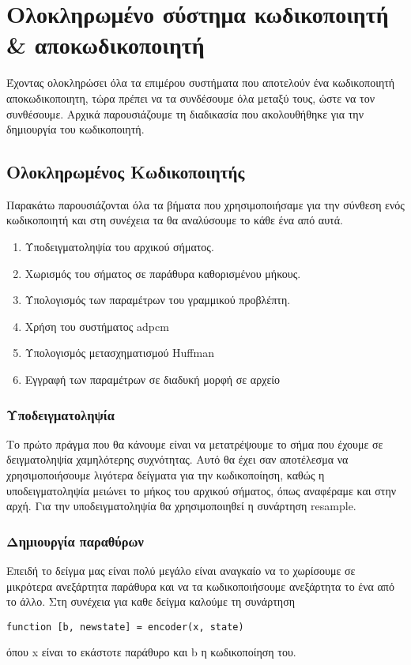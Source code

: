 \chapter{Ολοκληρωμένο σύστημα κωδικοποιητή \& αποκωδικοποιητή}

\par Έχοντας ολοκληρώσει όλα τα επιμέρου συστήματα που αποτελούν ένα κωδικοποιητή 
αποκωδικοποιητη, τώρα πρέπει να τα συνδέσουμε όλα μεταξύ τους, ώστε να τον συνθέσουμε. 
Αρχικά παρουσιάζουμε τη διαδικασία που ακολουθήθηκε για την δημιουργία 
του κωδικοποιητή.
\section{Ολοκληρωμένος Κωδικοποιητής}
\par Παρακάτω παρουσιάζονται όλα τα βήματα που χρησιμοποιήσαμε για την σύνθεση ενός 
κωδικοποιητή και στη συνέχεια τα θα αναλύσουμε το κάθε ένα από αυτά.
\begin{enumerate}
\item Υποδειγματοληψία του αρχικού σήματος.
\item Χωρισμός του σήματος σε παράθυρα καθορισμένου μήκους.
\item Υπολογισμός των παραμέτρων του γραμμικού προβλέπτη.
\item Χρήση του συστήματος adpcm
\item Υπολογισμός μετασχηματισμού Huffman
\item Εγγραφή των παραμέτρων σε διαδυκή μορφή σε αρχείο
\end{enumerate}

\subsection{Υποδειγματοληψία}
\par Το πρώτο πράγμα που θα κάνουμε είναι να μετατρέψουμε το σήμα που έχουμε 
σε δειγματοληψία χαμηλότερης συχνότητας. Αυτό θα έχει σαν αποτέλεσμα να χρησιμοποιήσουμε
λιγότερα δείγματα για την κωδικοποίηση, καθώς η υποδειγματοληψία μειώνει το μήκος 
του αρχικού σήματος, όπως αναφέραμε και στην αρχή. Για την υποδειγματοληψία θα χρησιμοποιηθεί 
η συνάρτηση resample.

\subsection{Δημιουργία παραθύρων}
\par Επειδή το δείγμα μας είναι πολύ μεγάλο είναι αναγκαίο να το χωρίσουμε 
σε μικρότερα ανεξάρτητα παράθυρα και να τα κωδικοποιήσουμε ανεξάρτητα το ένα από 
το άλλο. Στη συνέχεια για καθε δείγμα καλούμε τη συνάρτηση 
\begin{lstlisting}[style=MyMatlab]
 function [b, newstate] = encoder(x, state)
\end{lstlisting}
όπου x είναι το εκάστοτε παράθυρο και b η κωδικοποίηση του. 

